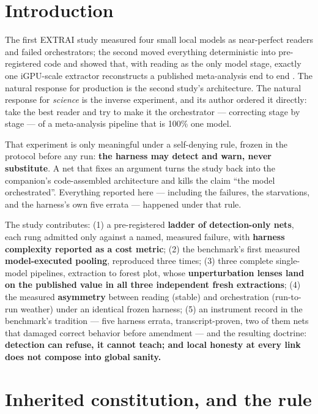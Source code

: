 \documentclass[11pt]{article}
\begin{document}
\section{Introduction}

The first EXTRAI study measured four small local models as near-perfect readers and failed orchestrators; the second moved everything deterministic into pre-registered code and showed that, with reading as the only model stage, exactly one iGPU-scale extractor reconstructs a published meta-analysis end to end \citep{barra2026companion,barra2026extrai2}. The natural response for production is the second study's architecture. The natural response for \emph{science} is the inverse experiment, and its author ordered it directly: take the best reader and try to make it the orchestrator --- correcting stage by stage --- of a meta-analysis pipeline that is 100\% one model.

That experiment is only meaningful under a self-denying rule, frozen in the protocol before any run: \textbf{the harness may detect and warn, never substitute}. A net that fixes an argument turns the study back into the companion's code-assembled architecture and kills the claim ``the model orchestrated''. Everything reported here --- including the failures, the starvations, and the harness's own five errata --- happened under that rule.

The study contributes: (1) a pre-registered \textbf{ladder of detection-only nets}, each rung admitted only against a named, measured failure, with \textbf{harness complexity reported as a cost metric}; (2) the benchmark's first measured \textbf{model-executed pooling}, reproduced three times; (3) three complete single-model pipelines, extraction to forest plot, whose \textbf{unperturbation lenses land on the published value in all three independent fresh extractions}; (4) the measured \textbf{asymmetry} between reading (stable) and orchestration (run-to-run weather) under an identical frozen harness; (5) an instrument record in the benchmark's tradition --- five harness errata, transcript-proven, two of them nets that damaged correct behavior before amendment --- and the resulting doctrine: \textbf{detection can refuse, it cannot teach; and local honesty at every link does not compose into global sanity.}

\section{Inherited constitution, and the rule}
\end{document}
